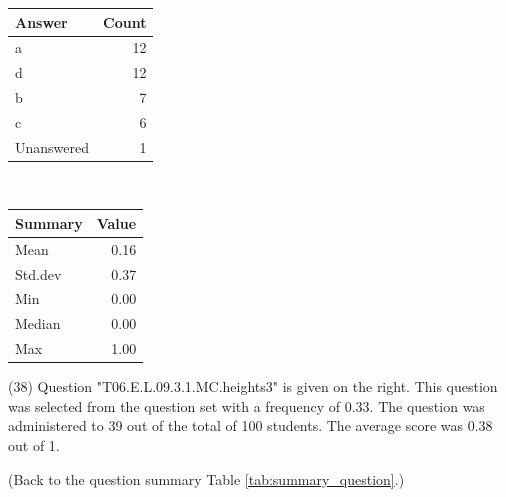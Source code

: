 \documentclass[12pt,nohyper]{tufte-handout}\usepackage[]{graphicx}\usepackage[]{color}
\begin{document}
\begin{center}%
\begin{tabular}{lr}
  \hline
Answer & Count \\ 
  \hline
a &  12 \\ 
  d &  12 \\ 
  b &   7 \\ 
  c &   6 \\ 
  Unanswered &   1 \\ 
   \hline
\end{tabular}
~~~~~~~~%
\begin{tabular}{lr}
  \hline
Summary & Value \\ 
  \hline
Mean & 0.16 \\ 
  Std.dev & 0.37 \\ 
  Min & 0.00 \\ 
  Median & 0.00 \\ 
  Max & 1.00 \\ 
   \hline
\end{tabular}
\end{center}\newpage{} (38) Question "T06.E.L.09.3.1.MC.heights3" is given on the right. This question was selected from the question set with a frequency of 0.33. The question was administered to 39 out of the total of 100 students. The average score was 0.38 out of 1.

 (Back to the question summary Table \ref{tab:summary_question}.)
\end{document}
